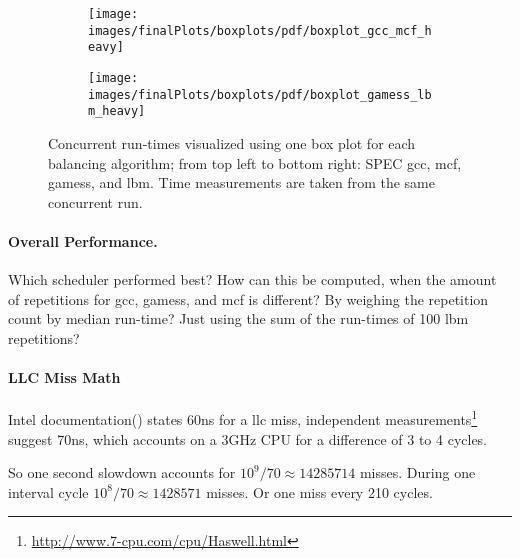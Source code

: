 \begin{figure}[h!]
  \begin{subfigure}{\textwidth}
  \texttt{[image: images/finalPlots/boxplots/pdf/boxplot\_gcc\_mcf\_heavy]}
  \end{subfigure}
  \begin{subfigure}{\textwidth}
  \texttt{[image: images/finalPlots/boxplots/pdf/boxplot\_gamess\_lbm\_heavy]}
  \end{subfigure}
  \caption{Concurrent run-times visualized using one box plot for each balancing
    algorithm; from top left to bottom right: SPEC gcc, mcf, gamess, and lbm.
    Time measurements are taken from the same concurrent run.}
    \label{eval:fig:box_heavy}
\end{figure}


\paragraph{Overall Performance.}
Which scheduler performed best?
How can this be computed, when the amount of repetitions for gcc, gamess, and
mcf is different?
By weighing the repetition count by  median run-time?
Just using the sum of the run-times of 100 lbm repetitions?



\paragraph{LLC Miss Math}
Intel documentation(\cite{intel_perf_analysis_2009}) states 60ns for a
\gls{llc} miss, independent
measurements\footnote{\url{http://www.7-cpu.com/cpu/Haswell.html}}
suggest 70ns, which accounts on a 3GHz CPU for a difference of 3 to 4 cycles.

So one second slowdown accounts for $10^9/70 \approx 14285714$ misses.
During one interval cycle $10^8/70 \approx 1428571$ misses.
Or one miss every 210 cycles.
